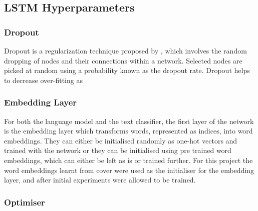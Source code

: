 \subsection{LSTM Hyperparameters}
\subsubsection{Dropout}
Dropout is a regularization technique proposed by \cite{Srivastava2014}, which involves the random dropping of nodes and their connections within a network. Selected nodes are picked at random using a probability known as the dropout rate. Dropout helps to decrease over-fitting as 
\subsubsection{Embedding Layer}
For both the language model and the text classifier, the first layer of the network is the embedding layer which transforms words, represented as indices, into word embeddings. They can either be initialised randomly as one-hot vectors and trained with the network or they can be initialised using pre trained word embeddings, which can either be left as is or trained further. For this project the word embeddings learnt from cover were used as the initialiser for the embedding layer, and after initial experiments were allowed to be trained.
\subsubsection{Optimiser}

